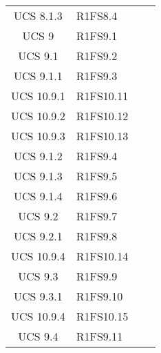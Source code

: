{\begin{longtable}{ c C{4cm} c c}
UCS 8.1.3 & R1FS8.4\\

UCS 9 & R1FS9.1\\

UCS 9.1 & R1FS9.2\\


UCS 9.1.1 & R1FS9.3\\

UCS 10.9.1 & R1FS10.11\\

UCS 10.9.2 & R1FS10.12\\

UCS 10.9.3 & R1FS10.13\\

UCS 9.1.2 & R1FS9.4\\

UCS 9.1.3 & R1FS9.5\\

UCS 9.1.4 & R1FS9.6\\

UCS 9.2 & R1FS9.7\\

UCS 9.2.1 & R1FS9.8\\


UCS 10.9.4 & R1FS10.14\\

UCS 9.3 & R1FS9.9\\

UCS 9.3.1 & R1FS9.10\\

UCS 10.9.4 & R1FS10.15\\

UCS 9.4 & R1FS9.11\\





\end{longtable}
}






















